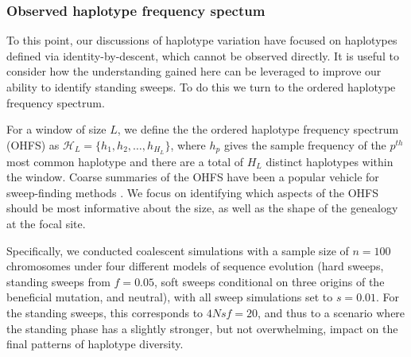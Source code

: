 \documentclass[a4paper,10pt]{article}
\begin{document}
\subsubsection*{Observed haplotype frequency spectum}

To this point, our discussions of haplotype variation have focused on haplotypes defined via identity-by-descent, which cannot be observed directly. It is useful to consider how the understanding gained here can be leveraged to improve our ability to identify standing sweeps. To do this we turn to the ordered haplotype frequency spectrum.




For a window of size $L$, we define the the ordered haplotype frequency spectrum (OHFS) as $\mathcal{H}_L = \{h_1,h_2,\dots,h_{H_{L}}\}$, where $h_p$ gives the sample frequency of the $p^{th}$ most common haplotype and there are a total of $H_{L}$ distinct haplotypes within the window. Coarse summaries of the OHFS have been a popular vehicle for sweep-finding methods \cite[e.g. EHH, iHS and H12:][]{Sabeti:2002ge,Voight:2006go,Garud:2015jy,Garud:2015fe}. We focus on identifying which aspects of the OHFS should be most informative about the size, as well as the shape of the genealogy at the focal site.

Specifically, we conducted coalescent simulations with a sample size of $n=100$ chromosomes under four different models of sequence evolution (hard sweeps, standing sweeps from $f=0.05$, soft sweeps conditional on three origins of the beneficial mutation, and neutral), with all sweep simulations set to $s=0.01$. For the standing sweeps, this corresponds to $4Nsf = 20$, and thus to a scenario where the standing phase has a slightly stronger, but not overwhelming, impact on the final patterns of haplotype diversity.
\end{document}
